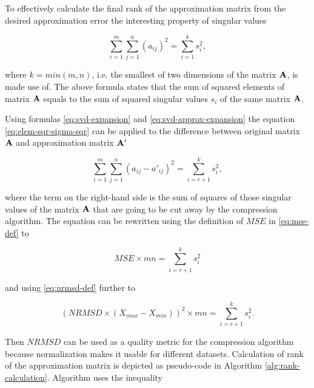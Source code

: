 To effectively calculate the final rank of the approximation matrix from the desired approximation error the interesting property of singular values


\begin{equation}
\sum_{i=1}^{m} \sum_{j=1}^{n} (a_{ij})^{2} = \sum_{i=1}^{k}{s_{i}^{2}},
\label{eq:elem-sqr-sigma-sqr}
\end{equation}

\noindent
where $k=min(m, n)$, i.e. the smallest of two dimensions of the matrix $\mathbf{A}$, is made use of. The above formula states that the sum of squared elements of matrix $\mathbf{A}$ equals to the sum of squared singular values $s_{i}$ of the same matrix $\mathbf{A}$.

Using formulas \eqref{eq:svd-expansion} and \eqref{eq:svd-approx-expansion} the equation \eqref{eq:elem-sqr-sigma-sqr} can be applied to the difference between original matrix $\mathbf{A}$ and approximation matrix $\mathbf{A'}$

\begin{equation}
\sum_{i=1}^{m} \sum_{j=1}^{n} (a_{ij} - a'_{ij})^{2} = \sum_{i=r+1}^{k}{s_{i}^{2}},
\end{equation}

\noindent
where the term on the right-hand side is the sum of squares of those singular values of the matrix $\mathbf{A}$ that are going to be cut away by the compression algorithm. The equation can be rewritten using the definition of $\mathit{MSE}$ in \eqref{eq:mse-def} to

\begin{equation}
\mathit{MSE} \times m n = \sum_{i=r+1}^{k} s_{i}^{2}
\end{equation}

\noindent
and using \eqref{eq:nrmsd-def} further to

\begin{equation}
(\mathit{NRMSD} \times (X_{max}-X_{min}))^{2} \times m n = \sum_{i=r+1}^{k} s_{i}^{2}.
\end{equation}

Then $\mathit{NRMSD}$ can be used as a quality metric for the compression algorithm because normalization makes it usable for different datasets. Calculation of rank of the approximation matrix is depicted as pseudo-code in Algorithm \ref{alg:rank-calculation}. Algorithm uses the inequality

